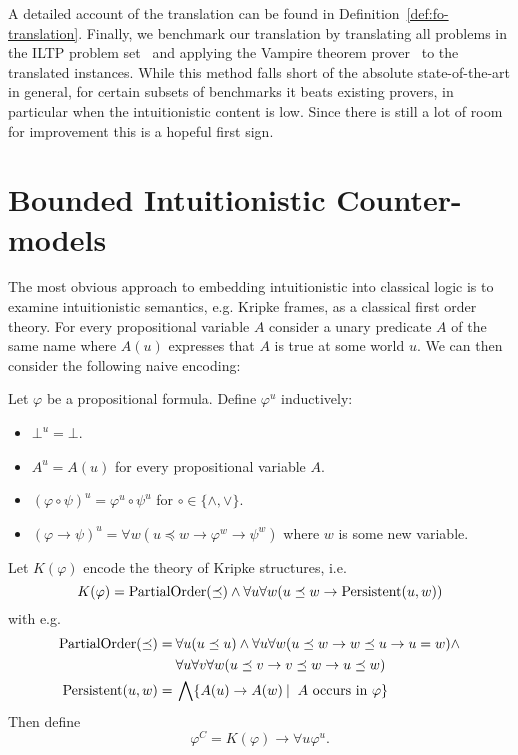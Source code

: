 \documentclass[runningheads]{llncs}
\begin{document}
A detailed account of the translation can be found in Definition~\ref{def:fo-translation}. Finally, we benchmark our translation by translating all problems in the ILTP problem set~\cite{iltp} and applying the Vampire theorem prover~\cite{kovacs2013first} to the translated instances. While this method falls short of the absolute state-of-the-art in general, for certain subsets of benchmarks it beats existing provers, in particular when the intuitionistic content is low. Since there is still a lot of room for improvement this is a hopeful first sign.


\section{Bounded Intuitionistic Counter-models}

The most obvious approach to embedding intuitionistic into classical logic is to examine intuitionistic semantics, e.g. Kripke frames, as a classical first order theory. For every propositional variable $A$ consider a unary predicate $A$ of the same name where $A(u)$ expresses that $A$ is true at some world $u$. We can then consider the following naive encoding:

\begin{definition}
	Let $\varphi$ be a propositional formula. Define $\varphi^{u}$ inductively:
	\begin{itemize}
		\item $\bot^u = \bot$.
		\item $A^{u} = A(u)$ for every propositional variable $A$.
		\item $(\varphi\circ\psi)^u = \varphi^u\circ\psi^u$ for $\circ\in\{\wedge, \vee\}$.
		\item $(\varphi\to \psi)^u = \forall w(u\preceq w\to\varphi^{w}\to\psi^{w})$ where $w$ is some new variable.
	\end{itemize}
	Let $K(\varphi)$ encode the theory of Kripke structures, i.e.
	$$K(\varphi) = \text{\normalfont PartialOrder}(\preceq)\wedge\forall u\forall w(u\preceq w\to \text{\normalfont Persistent}(u, w))$$
	with e.g.
	\begin{align*}
		\text{\normalfont PartialOrder}(\preceq) =&\:\forall u(u\preceq u)\wedge\forall u\forall w(u\preceq w\to w\preceq u\to u = w)\wedge\\&\:\forall u\forall v\forall w(u\preceq v\to v\preceq w\to u\preceq w)\\
		\text{\normalfont Persistent}(u, w)=&\:\bigwedge \{A(u)\to A(w)\:|\: \text{ $A$ occurs in $\varphi$}\}
	\end{align*}
	Then define
	$$\varphi^{C} = K(\varphi)\to \forall u\varphi^{u}.$$
\end{definition}
\end{document}
